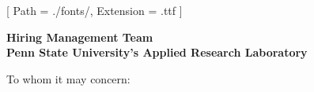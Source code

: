 


\renewcommand{\photo}[2]{}

\geometry{
  left=2cm,
  right=2cm,
  top=2cm,
  bottom=2cm
}



\makecvheader

\setmainfont{NotoSans-Regular}[
  Path = ./fonts/,
  Extension = .ttf
]

\vspace{1cm}
\indent\textbf{Hiring Management Team}\\
\indent\textbf{Penn State University’s Applied Research Laboratory}

\vspace{0.5cm}

\noindent To whom it may concern:

\vspace{0.5cm}

